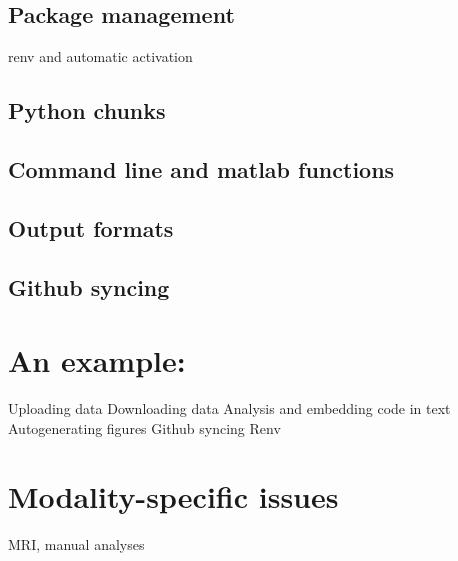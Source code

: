 \documentclass[
]{article}
\begin{document}
\hypertarget{package-management}{%
\subsection{Package management}\label{package-management}}

renv and automatic activation

\hypertarget{python-chunks}{%
\subsection{Python chunks}\label{python-chunks}}

\hypertarget{command-line-and-matlab-functions}{%
\subsection{Command line and matlab functions}\label{command-line-and-matlab-functions}}

\hypertarget{output-formats}{%
\subsection{Output formats}\label{output-formats}}

\hypertarget{github-syncing}{%
\subsection{Github syncing}\label{github-syncing}}

\hypertarget{an-example}{%
\section{An example:}\label{an-example}}

Uploading data
Downloading data
Analysis and embedding code in text
Autogenerating figures
Github syncing
Renv

\hypertarget{modality-specific-issues}{%
\section{Modality-specific issues}\label{modality-specific-issues}}

MRI, manual analyses
\end{document}
